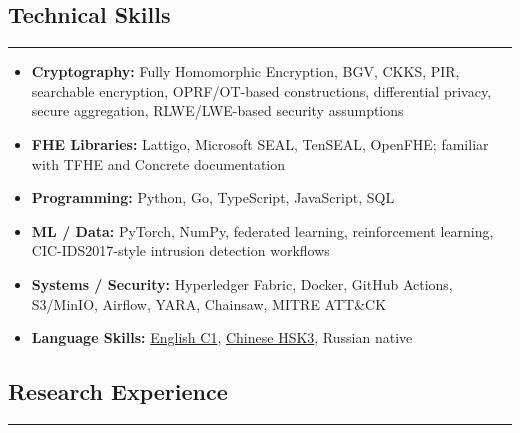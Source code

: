 \documentclass[11pt,letterpaper]{article}
\begin{document}
\vspace{0.2cm}

\subsection*{\Large Technical Skills}
\vspace{-0.5em}
\hrule
\vspace{0.3em}

\begin{itemize}[leftmargin=0em, noitemsep]
    \renewcommand\labelitemi{}
    \item \textbf{Cryptography:} Fully Homomorphic Encryption, BGV, CKKS, PIR, searchable encryption, OPRF/OT-based constructions, differential privacy, secure aggregation, RLWE/LWE-based security assumptions
    \item \textbf{FHE Libraries:} Lattigo, Microsoft SEAL, TenSEAL, OpenFHE; familiar with TFHE and Concrete documentation
    \item \textbf{Programming:} Python, Go, TypeScript, JavaScript, SQL
    \item \textbf{ML / Data:} PyTorch, NumPy, federated learning, reinforcement learning, CIC-IDS2017-style intrusion detection workflows
    \item \textbf{Systems / Security:} Hyperledger Fabric, Docker, GitHub Actions, S3/MinIO, Airflow, YARA, Chainsaw, MITRE ATT\&CK
    \item \textbf{Language Skills:}
    \href{https://certs.duolingo.com/751e0ef152565727b6d5fd909699ceaa}{English C1},
    \href{https://admin.chinesetest.cn/queryScore.do?sid=c2tActR9Wb%2704b861aefbdc5e9fd0b44afa717d08cbceb0720e582ce25f%2724d7sWsQ5nVUQSwD}{Chinese HSK3},
    Russian native
\end{itemize}

\vspace{0.2cm}

\subsection*{\Large Research Experience}
\vspace{-0.5em}
\hrule
\vspace{0.3em}
\end{document}
